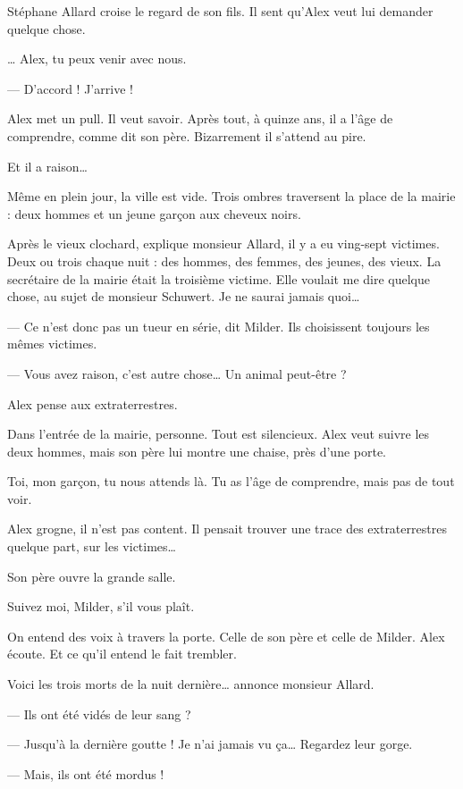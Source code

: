 Stéphane Allard croise le regard de son fils. Il sent qu'Alex veut lui demander quelque chose.

\og \ldots{} Alex, tu peux venir avec nous.

--- D'accord ! J'arrive ! \fg{}

Alex met un pull. Il veut savoir. Après tout, à quinze ans, il a l'âge de comprendre, comme dit son père. Bizarrement il s'attend
au pire.

Et il a raison\ldots{}

Même en plein jour, la ville est vide. Trois ombres traversent la place de la mairie : deux hommes et un jeune gar\c{c}on aux
cheveux noirs.

\og Après le vieux clochard, explique monsieur Allard, il y a eu ving-sept victimes. Deux ou trois chaque nuit : des hommes, des
femmes, des jeunes, des vieux. La secrétaire de la mairie était la troisième victime. Elle voulait me dire quelque chose, au sujet
de monsieur Schuwert. Je ne saurai jamais quoi\ldots{}

--- Ce n'est donc pas un tueur en série, dit Milder. Ils choisissent toujours les mêmes victimes.

--- Vous avez raison, c'est autre chose\ldots{} Un animal peut-être ? \fg{}

Alex pense aux extraterrestres.

Dans l'entrée de la mairie, personne. Tout est silencieux. Alex veut suivre les deux hommes, mais son père lui montre une chaise,
près d'une porte.

\og Toi, mon gar\c{c}on, tu nous attends là. Tu as l'âge de comprendre, mais pas de tout voir. \fg{}

Alex grogne, il n'est pas content. Il pensait trouver une trace des extraterrestres quelque part, sur les victimes\ldots{}

Son père ouvre la grande salle.

\og Suivez moi, Milder, s'il vous plaît. \fg{}

On entend des voix à travers la porte. Celle de son père et celle de Milder. Alex écoute. Et ce qu'il entend le fait trembler.

\og Voici les trois morts de la nuit dernière\ldots{} annonce monsieur Allard.

--- Ils ont été vidés de leur sang ?

--- Jusqu'à la dernière goutte ! Je n'ai jamais vu \c{c}a\ldots{} Regardez leur gorge.

--- Mais, ils ont été mordus !

